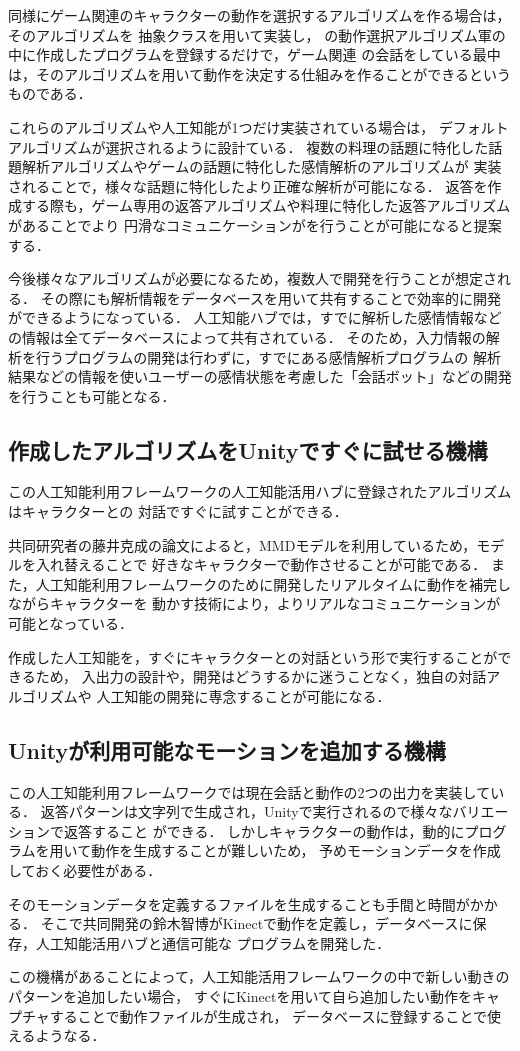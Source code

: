 同様にゲーム関連のキャラクターの動作を選択するアルゴリズムを作る場合は，そのアルゴリズムを
抽象クラスを用いて実装し，
の動作選択アルゴリズム軍の中に作成したプログラムを登録するだけで，ゲーム関連
の会話をしている最中は，そのアルゴリズムを用いて動作を決定する仕組みを作ることができるというものである．

これらのアルゴリズムや人工知能が1つだけ実装されている場合は，
デフォルトアルゴリズムが選択されるように設計ている．
複数の料理の話題に特化した話題解析アルゴリズムやゲームの話題に特化した感情解析のアルゴリズムが
実装されることで，様々な話題に特化したより正確な解析が可能になる．
返答を作成する際も，ゲーム専用の返答アルゴリズムや料理に特化した返答アルゴリズムがあることでより
円滑なコミュニケーションがを行うことが可能になると提案する．

今後様々なアルゴリズムが必要になるため，複数人で開発を行うことが想定される．
その際にも解析情報をデータベースを用いて共有することで効率的に開発ができるようになっている．
人工知能ハブでは，すでに解析した感情情報などの情報は全てデータベースによって共有されている．
そのため，入力情報の解析を行うプログラムの開発は行わずに，すでにある感情解析プログラムの
解析結果などの情報を使いユーザーの感情状態を考慮した「会話ボット」などの開発を行うことも可能となる．\\
\subsection{作成したアルゴリズムをUnityですぐに試せる機構}
この人工知能利用フレームワークの人工知能活用ハブに登録されたアルゴリズムはキャラクターとの
対話ですぐに試すことができる．

共同研究者の藤井克成の論文\cite{fuji}によると，MMDモデルを利用しているため，モデルを入れ替えることで
好きなキャラクターで動作させることが可能である．
また，人工知能利用フレームワークのために開発したリアルタイムに動作を補完しながらキャラクターを
動かす技術により，よりリアルなコミュニケーションが可能となっている．

作成した人工知能を，すぐにキャラクターとの対話という形で実行することができるため，
入出力の設計や，開発はどうするかに迷うことなく，独自の対話アルゴリズムや
人工知能の開発に専念することが可能になる．
\subsection{Unityが利用可能なモーションを追加する機構}
この人工知能利用フレームワークでは現在会話と動作の2つの出力を実装している．
返答パターンは文字列で生成され，Unityで実行されるので様々なバリエーションで返答すること
ができる．
しかしキャラクターの動作は，動的にプログラムを用いて動作を生成することが難しいため，
予めモーションデータを作成しておく必要性がある．

そのモーションデータを定義するファイルを生成することも手間と時間がかかる．
そこで共同開発の鈴木智博がKinectで動作を定義し，データベースに保存，人工知能活用ハブと通信可能な
プログラムを開発した\cite{suzuki}．

この機構があることによって，人工知能活用フレームワークの中で新しい動きのパターンを追加したい場合，
すぐにKinectを用いて自ら追加したい動作をキャプチャすることで動作ファイルが生成され，
データベースに登録することで使えるようなる．